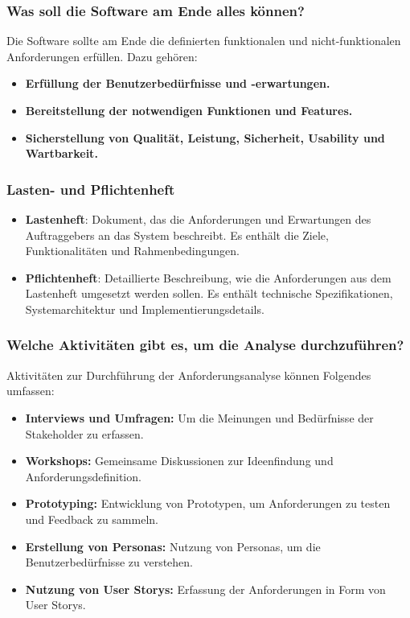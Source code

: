 \documentclass[main.tex]{subfiles}
\begin{document}
\subsubsection*{Was soll die Software am Ende alles können?}
Die Software sollte am Ende die definierten funktionalen und nicht-funktionalen Anforderungen erfüllen. Dazu gehören:
\begin{itemize}
    \item \textbf{Erfüllung der Benutzerbedürfnisse und -erwartungen.}
    \item \textbf{Bereitstellung der notwendigen Funktionen und Features.}
    \item \textbf{Sicherstellung von Qualität, Leistung, Sicherheit, Usability und Wartbarkeit.}
\end{itemize}

\subsubsection*{Lasten- und \gls{Pflichtenheft}}
\begin{itemize}
    \item \textbf{\gls{Lastenheft}}: Dokument, das die Anforderungen und Erwartungen des Auftraggebers an das System beschreibt. Es enthält die Ziele, Funktionalitäten und Rahmenbedingungen.
    \item \textbf{\gls{Pflichtenheft}}: Detaillierte Beschreibung, wie die Anforderungen aus dem \gls{Lastenheft} umgesetzt werden sollen. Es enthält technische Spezifikationen, Systemarchitektur und Implementierungsdetails.
\end{itemize} 

\subsubsection*{Welche Aktivitäten gibt es, um die Analyse durchzuführen?}
Aktivitäten zur Durchführung der Anforderungsanalyse können Folgendes umfassen:
\begin{itemize}
    \item \textbf{Interviews und Umfragen:} Um die Meinungen und Bedürfnisse der Stakeholder zu erfassen.
    \item \textbf{Workshops:} Gemeinsame Diskussionen zur Ideenfindung und Anforderungsdefinition.
    \item \textbf{\gls{Prototyping}:} Entwicklung von Prototypen, um Anforderungen zu testen und Feedback zu sammeln.
    \item \textbf{Erstellung von Personas:} Nutzung von Personas, um die Benutzerbedürfnisse zu verstehen.
    \item \textbf{Nutzung von \glspl{User Story}:} Erfassung der Anforderungen in Form von \glspl{User Story}.
\end{itemize}
\end{document}
